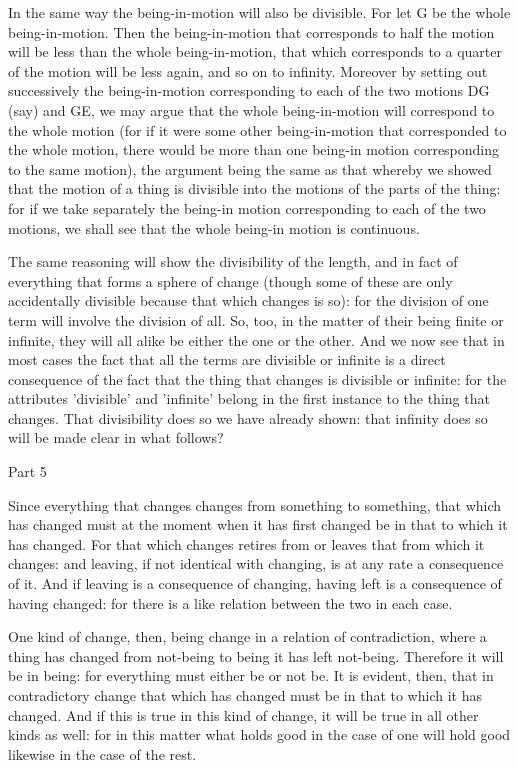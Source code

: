 In the same way the being-in-motion will also be divisible. For let
G be the whole being-in-motion. Then the being-in-motion that corresponds
to half the motion will be less than the whole being-in-motion, that
which corresponds to a quarter of the motion will be less again, and
so on to infinity. Moreover by setting out successively the being-in-motion
corresponding to each of the two motions DG (say) and GE, we may argue
that the whole being-in-motion will correspond to the whole motion
(for if it were some other being-in-motion that corresponded to the
whole motion, there would be more than one being-in motion corresponding
to the same motion), the argument being the same as that whereby we
showed that the motion of a thing is divisible into the motions of
the parts of the thing: for if we take separately the being-in motion
corresponding to each of the two motions, we shall see that the whole
being-in motion is continuous. 

The same reasoning will show the divisibility of the length, and in
fact of everything that forms a sphere of change (though some of these
are only accidentally divisible because that which changes is so):
for the division of one term will involve the division of all. So,
too, in the matter of their being finite or infinite, they will all
alike be either the one or the other. And we now see that in most
cases the fact that all the terms are divisible or infinite is a direct
consequence of the fact that the thing that changes is divisible or
infinite: for the attributes 'divisible' and 'infinite' belong in
the first instance to the thing that changes. That divisibility does
so we have already shown: that infinity does so will be made clear
in what follows? 

Part 5

Since everything that changes changes from something to something,
that which has changed must at the moment when it has first changed
be in that to which it has changed. For that which changes retires
from or leaves that from which it changes: and leaving, if not identical
with changing, is at any rate a consequence of it. And if leaving
is a consequence of changing, having left is a consequence of having
changed: for there is a like relation between the two in each case.

One kind of change, then, being change in a relation of contradiction,
where a thing has changed from not-being to being it has left not-being.
Therefore it will be in being: for everything must either be or not
be. It is evident, then, that in contradictory change that which has
changed must be in that to which it has changed. And if this is true
in this kind of change, it will be true in all other kinds as well:
for in this matter what holds good in the case of one will hold good
likewise in the case of the rest. 

